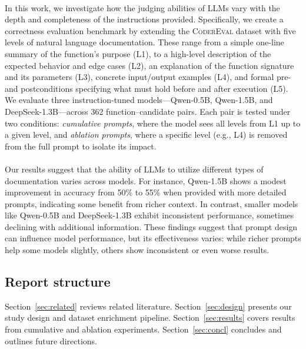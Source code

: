 \documentclass[a4paper]{usiinfbachelorproject}
\begin{document}
\\[2pt]
In this work, we investigate how the judging abilities of LLMs vary with the depth and completeness of the instructions provided. Specifically, we create a correctness evaluation benchmark by extending the \textsc{CoderEval} dataset with five levels of natural language documentation. These range from a simple one-line summary of the function's purpose (L1), to a high-level description of the expected behavior and edge cases (L2), an explanation of the function signature and its parameters (L3), concrete input/output examples (L4), and formal pre- and postconditions specifying what must hold before and after execution (L5). We evaluate three instruction-tuned models—Qwen-0.5B, Qwen-1.5B, and DeepSeek-1.3B—across 362 function–candidate pairs. Each pair is tested under two conditions: \emph{cumulative prompts}, where the model sees all levels from L1 up to a given level, and \emph{ablation prompts}, where a specific level (e.g., L4) is removed from the full prompt to isolate its impact.\\
\\[2pt]
Our results suggest that the ability of LLMs to utilize different types of documentation varies across models. For instance, Qwen-1.5B shows a modest improvement in accuracy from 50\% to 55\% when provided with more detailed prompts, indicating some benefit from richer context. In contrast, smaller models like Qwen-0.5B and DeepSeek-1.3B exhibit inconsistent performance, sometimes declining with additional information. These findings suggest that prompt design can influence model performance, but its effectiveness varies: while richer prompts help some models slightly, others show inconsistent or even worse results.

\subsection*{Report structure}

Section~\ref{sec:related} reviews related literature.  
Section~\ref{sec:design} presents our study design and dataset enrichment pipeline.  
Section~\ref{sec:results} covers results from cumulative and ablation experiments.  
Section~\ref{sec:concl} concludes and outlines future directions.

\end{document}
